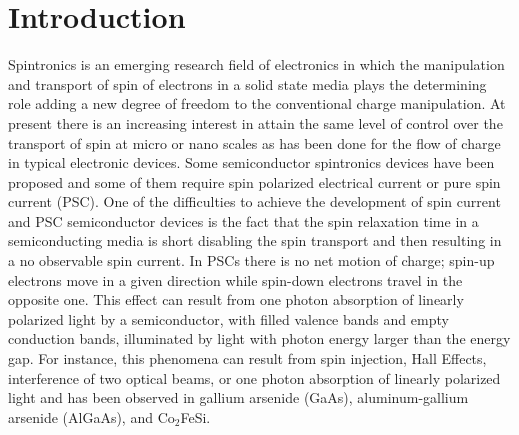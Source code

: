\documentclass[floatfix,prb,aps,superscriptaddress,showpacs,11pt,preprint,letterpaper]{revtex4}
\begin{document}
\section{Introduction}
\label{sec:introduction}


Spintronics is an emerging research field of electronics in which the
manipulation and transport of spin of electrons in a solid state 
media plays the determining role adding a new degree of freedom to the
conventional charge manipulation.\cite{wolfSC04,fabianAPS07}
% 
At present there is an increasing interest in attain the same level of control
over the transport of spin at micro or nano scales as has been done for the
flow of charge in typical electronic devices.\cite{awschalomNP2007} Some
semiconductor spintronics devices have been proposed \cite{majumdarAPL06,
dattaAPL90,gotteNat16,pershinPRB08} and some of them require spin polarized
electrical current \cite{awschalomSSBM13} or pure spin current (PSC).
% 
One of the difficulties to achieve the development of spin current and PSC
semiconductor devices is the fact that the spin relaxation time in a
semiconducting media is short disabling the spin transport and then resulting
in a no observable spin current.\cite{murakamiSc03}
% 
In PSCs there is no net
motion of charge; spin-up electrons move in a given direction while spin-down
electrons travel in the opposite one. 
This effect can result from one photon absorption of linearly polarized light
by a semiconductor, with filled valence bands and empty conduction bands,
illuminated by light with photon energy larger than the energy gap.
For instance,
this phenomena can result from spin
injection,\cite{malPRB03} Hall Effects,\cite{sinovaPRB04} interference of two
optical beams,\cite{bhatPRL00, najmaiePRB03} or one photon absorption of
linearly polarized light\cite{bhatPRL05} and has been observed in gallium
arsenide (GaAs),\cite{zhaoPRL2006, stevensPRL03} aluminum-gallium arsenide
(AlGaAs),\cite{stevensPRL03} and Co$_2$FeSi.\cite{kimuraNGPAM12}
\end{document}
